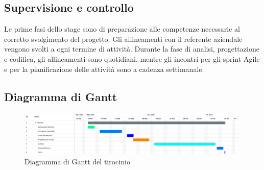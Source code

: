 \subsection{Supervisione e controllo}
Le prime fasi dello stage sono di preparazione alle competenze necessarie al corretto svolgimento
del progetto. Gli allineamenti con il referente aziendale vengono svolti a ogni termine di attività. Durante la fase di analisi, progettazione e codifica, gli allineamenti sono quotidiani, mentre gli incontri per gli sprint Agile e per la pianificazione delle attività
sono a cadenza settimanale.
\newpage
\subsection{Diagramma di Gantt}
\begin{figure}[!h] 
    \centering 
    \includegraphics[width=350pt]{images/diagrammaGantt.png} 
    \caption{Diagramma di Gantt del tirocinio}
\end{figure}
